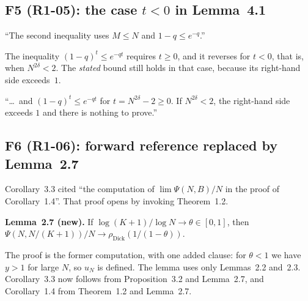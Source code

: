 \documentclass[10pt]{article}
\newcommand{\dick}{\rho_{\mathrm{Dick}}}
\begin{document}
\subsection*{F5 (R1-05): the case $t<0$ in Lemma~4.1}
\begin{before}
``The second inequality uses $M\le N$ and $1-q\le e^{-q}$.''
\end{before}
\begin{whywrong}
The inequality $(1-q)^t\le e^{-qt}$ requires $t\ge0$, and it reverses for $t<0$, that is, when $N^{2\delta}<2$. The \emph{stated} bound still holds in that case, because its right-hand side exceeds~$1$.
\end{whywrong}
\begin{after}
``\ldots\ and $(1-q)^t\le e^{-qt}$ for $t=N^{2\delta}-2\ge0$. If $N^{2\delta}<2$, the right-hand side exceeds $1$ and there is nothing to prove.''
\end{after}

\subsection*{F6 (R1-06): forward reference replaced by Lemma~2.7}
\begin{before}
Corollary~3.3 cited ``the computation of $\lim\Psi(N,B)/N$ in the proof of Corollary~1.4''. That proof opens by invoking Theorem~1.2.
\end{before}
\begin{after}
\textbf{Lemma~2.7 (new).} If $\log(K+1)/\log N\to\theta\in[0,1]$, then $\Psi(N,N/(K+1))/N\to\dick(1/(1-\theta))$.

The proof is the former computation, with one added clause: for $\theta<1$ we have $y>1$ for large $N$, so $u_N$ is defined. The lemma uses only Lemmas~2.2 and~2.3. Corollary~3.3 now follows from Proposition~3.2 and Lemma~2.7, and Corollary~1.4 from Theorem~1.2 and Lemma~2.7.
\end{after}
\end{document}
